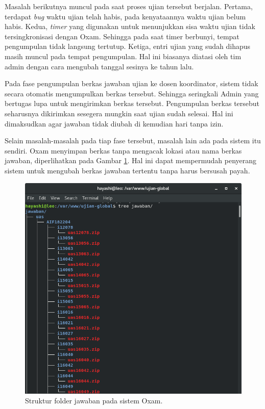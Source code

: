 Masalah berikutnya muncul pada saat proses ujian tersebut berjalan. Pertama,
terdapat \textit{bug} waktu ujian telah habis, pada kenyataannya waktu ujian
belum habis. Kedua, \textit{timer} yang digunakan untuk menunjukkan sisa waktu
ujian tidak tersingkronisasi dengan Oxam. Sehingga pada saat timer berbunyi,
tempat pengumpulan tidak langsung tertutup. Ketiga, entri ujian yang sudah
dihapus masih muncul pada tempat pengumpulan. Hal ini biasanya diatasi oleh tim
admin dengan cara mengubah tanggal sesinya ke tahun lalu.

Pada fase pengumpulan berkas jawaban ujian ke dosen koordinator, sistem tidak
secara otomatis mengumpulkan berkas tersebut. Sehingga seringkali Admin yang
bertugas lupa untuk mengirimkan berkas tersebut. Pengumpulan berkas tersebut
seharusnya dikirimkan sesegera mungkin saat ujian sudah selesai. Hal ini
dimaksudkan agar jawaban tidak diubah di kemudian hari tanpa izin.

Selain masalah-masalah pada tiap fase tersebut, masalah lain ada pada sistem itu
sendiri. Oxam menyimpan berkas tanpa mengacak lokasi atau nama berkas jawaban,
diperlihatkan pada Gambar \ref{fig:ss-folder-jawaban}. Hal ini dapat
mempermudah penyerang sistem untuk mengubah berkas jawaban tertentu tanpa
harus bersusah payah.

\begin{figure}[ht]
    \centering
    \includegraphics[width=0.6\paperwidth]{Gambar/ss-struktur-folder-jawaban.png}
    \caption{Struktur folder jawaban pada sistem Oxam.}
    \label{fig:ss-folder-jawaban}
\end{figure}

